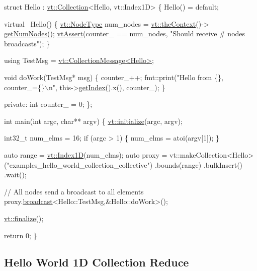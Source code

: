\begin{DoxyCodeInclude}
\textcolor{keyword}{struct }Hello : \hyperlink{structvt_1_1vrt_1_1collection_1_1_collection}{vt::Collection}<Hello, vt::Index1D> \{
  Hello() = \textcolor{keywordflow}{default};

  \textcolor{keyword}{virtual} ~Hello() \{
    \hyperlink{namespacevt_a866da9d0efc19c0a1ce79e9e492f47e2}{vt::NodeType} num\_nodes = \hyperlink{namespacevt_a26551fe0e6e6a1371111df5b12c7e92c}{vt::theContext}()->
      \hyperlink{structvt_1_1ctx_1_1_context_a7f41071aadf6d5fa9e1b6c703c5ff19d}{getNumNodes}();
    \hyperlink{config__assert_8h_aeddd4990a496e91a0ca5d6c16437359b}{vtAssert}(counter\_ == num\_nodes, \textcolor{stringliteral}{"Should receive # nodes broadcasts"});
  \}

  \textcolor{keyword}{using} TestMsg = \hyperlink{structvt_1_1vrt_1_1collection_1_1_collection_message}{vt::CollectionMessage<Hello>};

  \textcolor{keywordtype}{void} doWork(TestMsg* msg) \{
    counter\_++;
    fmt::print(\textcolor{stringliteral}{"Hello from \{\}, counter\_=\{\}\(\backslash\)n"}, this->\hyperlink{structvt_1_1vrt_1_1collection_1_1_indexable_a28d05f23e7a20e12e94b8235305c1e82}{getIndex}().x(), counter\_);
  \}

\textcolor{keyword}{private}:
  \textcolor{keywordtype}{int} counter\_ = 0;
\};

\textcolor{keywordtype}{int} main(\textcolor{keywordtype}{int} argc, \textcolor{keywordtype}{char}** argv) \{
  \hyperlink{namespacevt_aae6ab5af3e11886ce73c4c3ffa008201}{vt::initialize}(argc, argv);

  int32\_t num\_elms = 16;
  \textcolor{keywordflow}{if} (argc > 1) \{
    num\_elms = atoi(argv[1]);
  \}

  \textcolor{keyword}{auto} range = \hyperlink{namespacevt_a5540efc78234273e1796fb003fe4d234}{vt::Index1D}(num\_elms);
  \textcolor{keyword}{auto} proxy = vt::makeCollection<Hello>(\textcolor{stringliteral}{"examples\_hello\_world\_collection\_collective"})
    .bounds(range)
    .bulkInsert()
    .wait();

  \textcolor{comment}{// All nodes send a broadcast to all elements}
  proxy.\hyperlink{structvt_1_1objgroup_1_1proxy_1_1_proxy_a0b716ca776b1f06e0d7d45afbe9e5274}{broadcast}<Hello::TestMsg,&Hello::doWork>();

  \hyperlink{namespacevt_a540d90dbd6e97b69f1dcbc9ee9314cff}{vt::finalize}();

  \textcolor{keywordflow}{return} 0;
\}
\end{DoxyCodeInclude}
 \hypertarget{collection_reduce-hello-world-collection}{}\subsection{Hello World 1\+D Collection Reduce}\label{collection_reduce-hello-world-collection}

